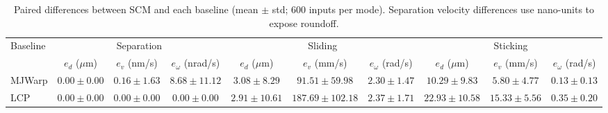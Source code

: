 \begin{table}[t]
\centering
\caption{CSO contact guidance on successful trials (mean \textpm{} std; LM: three selected tasks).}
\label{tab:cso_contact_guidance}
\footnotesize
{}
\end{table}

\begin{table}[t]
\centering
\caption{Paired differences between SCM and each baseline (mean $\pm$ std; 600 inputs per mode). Separation velocity differences use nano-units to expose roundoff.}
\label{tab:scm_lcp_accuracy}
\scriptsize
\setlength{\tabcolsep}{2pt}
\renewcommand{\arraystretch}{0.95}
\begin{tabular}{@{}l*{9}{c}@{}}
\toprule
\multirow{2}{*}{Baseline} & \multicolumn{3}{c}{Separation} & \multicolumn{3}{c}{Sliding} & \multicolumn{3}{c}{Sticking} \\
\cmidrule(lr){2-4}\cmidrule(lr){5-7}\cmidrule(lr){8-10}
 & $e_d$ ($\mu$m) & $e_v$ (nm/s) & $e_\omega$ (nrad/s) & $e_d$ ($\mu$m) & $e_v$ (mm/s) & $e_\omega$ (rad/s) & $e_d$ ($\mu$m) & $e_v$ (mm/s) & $e_\omega$ (rad/s) \\
\midrule
MJWarp & $0.00 \pm 0.00$ & $0.16 \pm 1.63$ & $8.68 \pm 11.12$ & $3.08 \pm 8.29$ & $91.51 \pm 59.98$ & $2.30 \pm 1.47$ & $10.29 \pm 9.83$ & $5.80 \pm 4.77$ & $0.13 \pm 0.13$ \\
LCP & $0.00 \pm 0.00$ & $0.00 \pm 0.00$ & $0.00 \pm 0.00$ & $2.91 \pm 10.61$ & $187.69 \pm 102.18$ & $2.37 \pm 1.71$ & $22.93 \pm 10.58$ & $15.33 \pm 5.56$ & $0.35 \pm 0.20$ \\
\bottomrule
\end{tabular}
\end{table}


